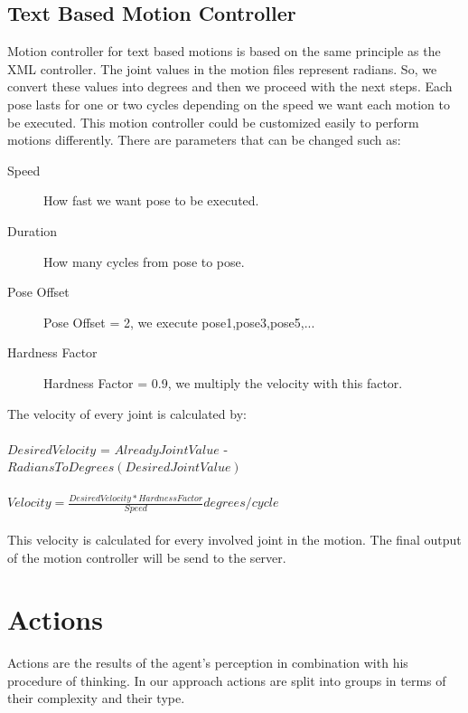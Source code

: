 \subsection{Text Based Motion Controller}
Motion controller for text based motions is based on the same principle as the XML controller. The joint values in the motion files represent
radians. So, we convert these values into degrees and then we proceed with the next steps. Each pose lasts for one or two cycles depending on the speed we want each motion to be executed. This motion controller could be customized easily to perform motions differently. There are parameters that can be changed such as:
\begin{description}
	\item[Speed] How fast we want pose to be executed.
	\item[Duration]	How many cycles from pose to pose.
	\item[Pose Offset] Pose Offset = 2, we execute pose1,pose3,pose5,...
	\item[Hardness Factor]	Hardness Factor = 0.9, we multiply the velocity with this factor.
\end{description}
The velocity of every joint is calculated by:\\
\\
$Desired Velocity$ = $Already Joint Value$ - $RadiansToDegrees(Desired Joint Value)$
\\
\\
$Velocity = \frac {Desired Velocity \ast Hardness Factor} {Speed} degrees/cycle$\\
\\
This velocity is calculated for every involved joint in the motion. The final output of the motion controller will be send to the server.





\section{Actions}
Actions are the results of the agent's perception in combination with his procedure of thinking.
In our approach actions are split into groups in terms of their complexity and their type. 

